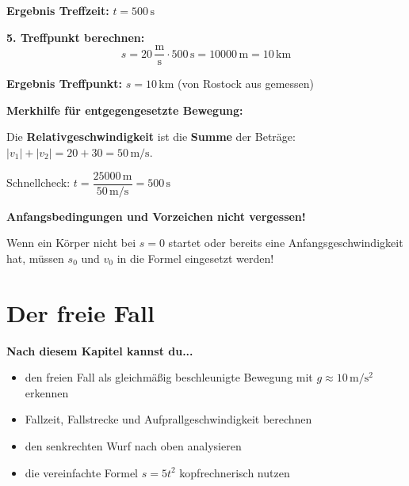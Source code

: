 \documentclass[11pt,a4paper]{article}
\begin{document}
\begin{beispiel}
\textbf{Ergebnis Treffzeit:} $\boxed{t = 500\,\mathrm{s}}$

\textbf{5. Treffpunkt berechnen:}
\[
s = 20\,\frac{\mathrm{m}}{\mathrm{s}} \cdot 500\,\mathrm{s} = 10000\,\mathrm{m} = 10\,\mathrm{km}
\]

\textbf{Ergebnis Treffpunkt:} $\boxed{s = 10\,\mathrm{km}}$ (von Rostock aus gemessen)

\begin{tipp}
\textbf{Merkhilfe für entgegengesetzte Bewegung:}

Die \textbf{Relativgeschwindigkeit} ist die \textbf{Summe} der Beträge: $|v_1| + |v_2| = 20 + 30 = 50\,\mathrm{m/s}$.

Schnellcheck: $t = \dfrac{25000\,\mathrm{m}}{50\,\mathrm{m/s}} = 500\,\mathrm{s}$ \checkmark
\end{tipp}
\end{beispiel}

\begin{warnung}
\textbf{Anfangsbedingungen und Vorzeichen nicht vergessen!}

Wenn ein Körper nicht bei $s = 0$ startet oder bereits eine Anfangsgeschwindigkeit hat, müssen $s_0$ und $v_0$ in die Formel eingesetzt werden!
\end{warnung}

\newpage
\section{Der freie Fall}

\begin{tcolorbox}[colback=merkegreen!5, colframe=merkegreen, boxrule=0.5pt]
\textbf{Nach diesem Kapitel kannst du...}
\begin{itemize}[itemsep=1pt]
\item[$\checkmark$] den freien Fall als gleichmäßig beschleunigte Bewegung mit $g \approx 10\,\mathrm{m/s^2}$ erkennen
\item[$\checkmark$] Fallzeit, Fallstrecke und Aufprallgeschwindigkeit berechnen
\item[$\checkmark$] den senkrechten Wurf nach oben analysieren
\item[$\checkmark$] die vereinfachte Formel $s = 5t^2$ kopfrechnerisch nutzen
\end{itemize}
\end{tcolorbox}
\end{document}
